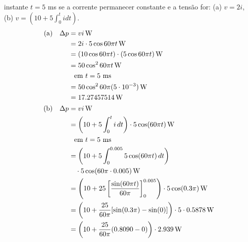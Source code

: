 \begin{enumerate}
	      instante \( t = 5\) ms se a corrente permanecer constante e a tensão
	      for: (a) \( v = 2i \), (b) \( v = (10 + 5 \int_0^t i dt) \).
	      \begin{align*}
		      \text{(a)}\quad &
		      \begin{aligned}[t]
			      \Delta p & = vi \,\text{W}                                            \\
			               & = 2i \cdot 5 \cos{60} \pi t \, \text{W}                    \\
			               & = (10 \cos{60} \pi t) \cdot (5 \cos{60} \pi t) \, \text{W} \\
			               & = 50 \cos^2{60} \pi t \, \text{W}                          \\
			               & \hphantom{=} \text{em \( t = 5 \) ms}                      \\
			               & = 50 \cos^2{60} \pi (5 \cdot 10^{-3}) \, \text{W}          \\
			               & = 17.27457514 \,\text{W}                                   \\
		      \end{aligned}
		      \\
		      \text{(b)}\quad &
		      \begin{aligned}[t]
			      \Delta p & = v i \,\text{W}                                                                                          \\
			               & = \left(10 + 5 \int_0^t i\, dt\right) \cdot 5 \cos(60\pi t) \,\text{W}                                    \\
			               & \hphantom{=} \text{em \( t = 5 \) ms}                                                                     \\
			               & = \left(10 + 5 \int_0^{0.005} 5 \cos(60\pi t)\, dt\right)                                                 \\
			               & \quad \cdot 5 \cos(60\pi \cdot 0.005) \,\text{W}                                                          \\
			               & = \left(10 + 25 \left[\frac{\sin(60\pi t)}{60\pi}\right]_0^{0.005}\right) \cdot 5 \cos(0.3\pi) \,\text{W} \\
			               & = \left(10 + \frac{25}{60\pi} [\sin(0.3\pi) - \sin(0)]\right) \cdot 5 \cdot 0.5878 \,\text{W}             \\
			               & = \left(10 + \frac{25}{60\pi} (0.8090 - 0)\right) \cdot 2.939 \,\text{W}                                  \\

\end{aligned}
\end{align*}
\end{enumerate}
